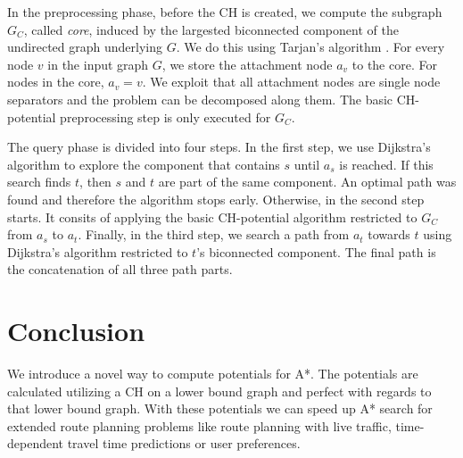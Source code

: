 \documentclass[a4paper,UKenglish,cleveref, autoref]{lipics-v2019}
\begin{document}
In the preprocessing phase, before the CH is created, we compute the subgraph $G_C$, called \emph{core}, induced by the largested biconnected component of the undirected graph underlying $G$.
We do this using Tarjan's algorithm \cite{Tarjan's algorithm}.
For every node $v$ in the input graph $G$, we store the attachment node $a_v$ to the core.
For nodes in the core, $a_v=v$.
We exploit that all attachment nodes are single node separators and the problem can be decomposed along them.
The basic CH-potential preprocessing step is only executed for $G_C$.

The query phase is divided into four steps.
In the first step, we use Dijkstra's algorithm to explore the component that contains $s$ until $a_s$ is reached.
If this search finds $t$, then $s$ and $t$ are part of the same component.
An optimal path was found and therefore the algorithm stops early.
Otherwise, in the second step starts.
It consits of applying the basic CH-potential algorithm restricted to $G_C$ from $a_s$ to $a_t$.
Finally, in the third step, we search a path from $a_t$ towards $t$ using Dijkstra's algorithm restricted to $t$'s biconnected component.
The final path is the concatenation of all three path parts.

\section{Conclusion}
\label{sec:conclusion}

We introduce a novel way to compute potentials for A*.
The potentials are calculated utilizing a CH on a lower bound graph and perfect with regards to that lower bound graph.
With these potentials we can speed up A* search for extended route planning problems like route planning with live traffic, time-dependent travel time predictions or user preferences.





\end{document}

